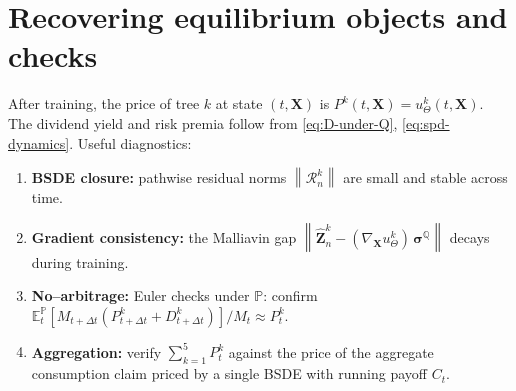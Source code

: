 \documentclass[11pt]{article}
\newcommand{\E}{\mathbb{E}}
\newcommand{\1}{\mathbbm{1}}
\newcommand{\norm}[1]{\left\lVert #1 \right\rVert}
\newcommand{\dt}{\Delta t}
\newcommand{\wh}{\widehat}
\newcommand{\bs}{\boldsymbol}
\begin{document}
\section{Recovering equilibrium objects and checks}
After training, the price of tree \(k\) at state \((t,\bs X)\) is \(P^k(t,\bs X)=u^k_\Theta(t,\bs X)\). The dividend yield and risk premia follow from \eqref{eq:D-under-Q}, \eqref{eq:spd-dynamics}. Useful diagnostics:
\begin{enumerate}[leftmargin=*, itemsep=0.25em]
  \item \textbf{BSDE closure:} pathwise residual norms \(\norm{\mathcal{R}^k_n}\) are small and stable across time.
  \item \textbf{Gradient consistency:} the Malliavin gap \(\norm{\wh{\bs Z}^k_n - (\nabla_{\bs X} u^k_\Theta)\,\bs\sigma^{\mathbb{Q}}}\) decays during training.
  \item \textbf{No--arbitrage:} Euler checks under \(\mathbb{P}\): confirm \(\E_t^\mathbb{P}[M_{t+\dt} (P^k_{t+\dt}+D^k_{t+\dt})]/M_t \approx P^k_t\).
  \item \textbf{Aggregation:} verify \( \sum_{k=1}^5 P^k_t \) against the price of the aggregate consumption claim priced by a single BSDE with running payoff \(C_t\).
\end{enumerate}
\end{document}
